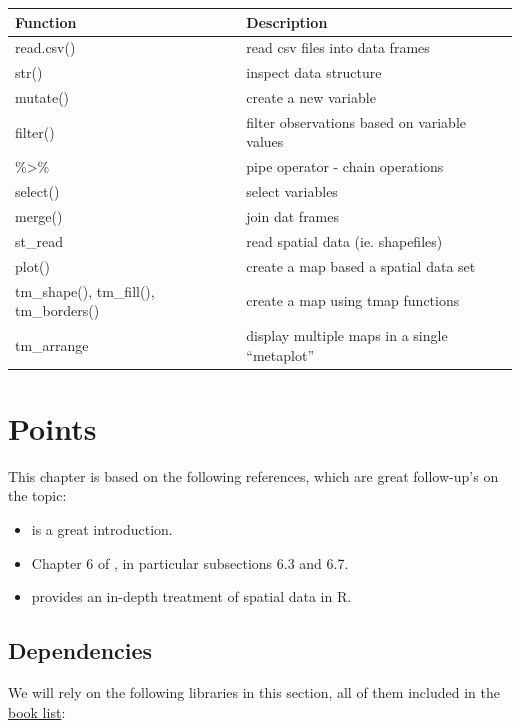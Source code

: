 \documentclass[
]{book}
\providecommand{\tightlist}{%
  \setlength{\itemsep}{0pt}\setlength{\parskip}{0pt}}
\begin{document}
\begin{longtable}[]{@{}ll@{}}
\toprule
Function & Description \\
\midrule
\endhead
read.csv() & read csv files into data frames \\
str() & inspect data structure \\
mutate() & create a new variable \\
filter() & filter observations based on variable values \\
\%\textgreater\% & pipe operator - chain operations \\
select() & select variables \\
merge() & join dat frames \\
st\_read & read spatial data (ie. shapefiles) \\
plot() & create a map based a spatial data set \\
tm\_shape(), tm\_fill(), tm\_borders() & create a map using tmap functions \\
tm\_arrange & display multiple maps in a single ``metaplot'' \\
\bottomrule
\end{longtable}

\hypertarget{points}{%
\chapter{Points}\label{points}}

This chapter is based on the following references, which are great follow-up's on the topic:

\begin{itemize}
\tightlist
\item
  \citet{lovelace2014introduction} is a great introduction.
\item
  Chapter 6 of \citet{comber2015}, in particular subsections 6.3 and 6.7.
\item
  \citet{bivand2013applied} provides an in-depth treatment of spatial data in R.
\end{itemize}

\hypertarget{dependencies-1}{%
\section{Dependencies}\label{dependencies-1}}

We will rely on the following libraries in this section, all of them included in the \protect\hyperlink{Dependency-list}{book list}:
\end{document}
